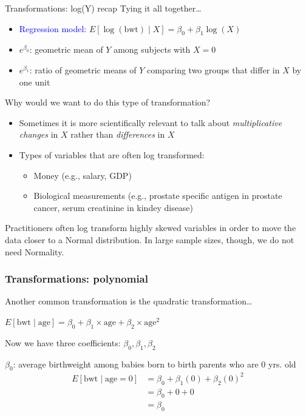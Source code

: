 \documentclass[10pt,t]{beamer}
\begin{document}
\begin{frame}{Transformations: log(Y) recap}
Tying it all together\dots

\vspace{0.3cm}

\begin{itemize}
	\item \textcolor{blue}{Regression model:} $E[\log(\text{bwt}) \mid X] = \beta_0 + \beta_1 \log(X)$
	\item \color{blue} $e^{\beta_0}$\color{black}: geometric mean of $Y$ among subjects with $X = 0$
	\item \color{blue}$e^{\beta_1}$\color{black}: ratio of geometric means of $Y$ comparing two groups that differ in $X$ by one unit
\end{itemize} \pause

\vspace{0.3cm}

Why would we want to do this type of transformation?

\begin{itemize}
	\item Sometimes it is more scientifically relevant to talk about \textit{multiplicative changes} in $X$ rather than \textit{differences} in $X$
	\item Types of variables that are often log transformed:
	\begin{itemize}
		\item Money (e.g., salary, GDP)
		\item Biological measurements (e.g., prostate specific antigen in prostate cancer, serum creatinine in kindey disease)
	\end{itemize}
\end{itemize}
\begin{footnotesize}
	Practitioners often log transform highly skewed variables in order to move the data closer to a Normal distribution. In large sample sizes, though, we do not need Normality. 
\end{footnotesize}
\end{frame}

\begin{frame}
\frametitle{Transformations: polynomial}
Another common transformation is the quadratic transformation\dots
\begin{center} $E[\text{bwt} \mid \text{age}] = \beta_0 + \beta_1 \times \text{age} + \beta_2 \times \text{age}^2$ \end{center}

Now we have three coefficients: $\beta_0, \beta_1, \beta_2$\pause

\vspace{0.3cm}

\color{blue} $\beta_0$: average birthweight among babies born to birth parents who are 0 yrs. old \color{black} \pause
\begin{align*}
E[\text{bwt} \mid \text{age} = 0] & = \beta_0 + \beta_1 (0) + \beta_2(0)^2 \\
& = \beta_0 + 0 + 0 \\
& = \beta_0
\end{align*}
\end{frame}
\end{document}
